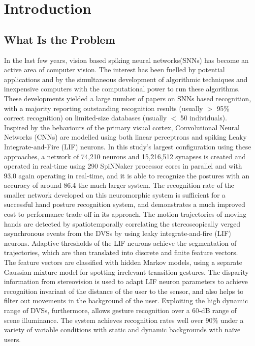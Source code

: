 \section{Introduction}
\label{sec:intro}
\subsection{What Is the Problem}
In the last few years, vision based spiking neural networks(SNNs) has become an active area of computer vision.
The interest has been fuelled by potential applications and by the simultaneous development of algorithmic techniques and inexpensive computers with the computational power to run these algorithms.
These developments yielded a large number of papers on SNNs based recognition, with a majority reporting outstanding recognition results (usually $>$ 95\% correct recognition) on limited-size databases (usually $<$ 50 individuals).
Inspired by the behaviours of the primary visual cortex, Convolutional Neural Networks (CNNs) are modelled using
both linear perceptrons and spiking Leaky Integrate-and-Fire (LIF) neurons. In this study's largest configuration using these
approaches, a network of 74,210 neurons and 15,216,512 synapses is created and operated in real-time using 290 SpiNNaker
processor cores in parallel and with 93.0%
again operating in real-time, and it is able to recognize the postures with an accuracy of around 86.4%
the much larger system. The recognition rate of the smaller network developed on this neuromorphic system is sufficient for a
successful hand posture recognition system, and demonstrates a much improved cost to performance trade-off in its approach.
The motion trajectories of moving hands are detected by spatiotemporally correlating the stereoscopically verged asynchronous events from the DVSs by using leaky integrate-and-fire (LIF) neurons. Adaptive thresholds of the LIF neurons achieve the segmentation of trajectories, which are then translated into discrete and finite feature vectors. The feature vectors are classified with hidden Markov models, using a separate Gaussian mixture model for spotting irrelevant transition gestures. The disparity information from stereovision is used to adapt LIF neuron parameters to achieve recognition invariant of the distance of the user to the sensor, and also helps to filter out movements in the background of the user. Exploiting the high dynamic range of DVSs, furthermore, allows gesture recognition over a 60-dB range of scene illuminance. The system achieves recognition rates well over 90\% under a variety of variable conditions with static and dynamic backgrounds with naïve users.
